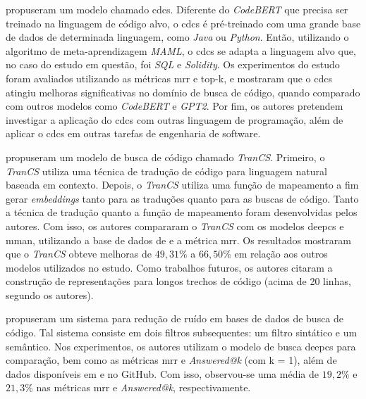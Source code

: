 \textcite{Chai2022CrossDomainDC} propuseram um modelo chamado \gls{cdcs}. Diferente do \textit{CodeBERT} que precisa ser treinado na linguagem de código alvo, o \gls{cdcs} é pré-treinado com uma grande base de dados de determinada linguagem, como \textit{Java} ou \textit{Python}. Então, utilizando o algoritmo de meta-aprendizagem \textit{MAML}, o \gls{cdcs} se adapta a linguagem alvo que, no caso do estudo em questão, foi \textit{SQL} e \textit{Solidity}. Os experimentos do estudo foram avaliados utilizando as métricas \gls{mrr} e top-k, e mostraram que o \gls{cdcs} atingiu melhoras significativas no domínio de busca de código, quando comparado com outros modelos como \textit{CodeBERT} e \textit{GPT2}. Por fim, os autores pretendem investigar a aplicação do \gls{cdcs} com outras linguagem de programação, além de aplicar o \gls{cdcs} em outras tarefas de engenharia de software.

\textcite{Sun2022CodeSB} propuseram um modelo de busca de código chamado \textit{TranCS}. Primeiro, o \textit{TranCS} utiliza uma técnica de tradução de código para linguagem natural baseada em contexto. Depois, o \textit{TranCS} utiliza uma função de mapeamento a fim gerar \textit{embeddings} tanto para as traduções quanto para as buscas de código. Tanto a técnica de tradução quanto a função de mapeamento foram desenvolvidas pelos autores.
Com isso, os autores compararam o \textit{TranCS} com os modelos \gls{deepcs} e \gls{mman}, utilizando a base de dados de \cite{Husain2019CodeSearchNetCE} e a métrica \gls{mrr}. Os resultados mostraram que o \textit{TranCS} obteve melhoras de $49,31\%$ a $66,50\%$ em relação aos outros modelos utilizados no estudo. Como trabalhos futuros, os autores citaram a construção de representações para longos trechos de código (acima de 20 linhas, segundo os autores).

\textcite{Sun2022OnTI} propuseram um sistema para redução de ruído em bases de dados de busca de código. Tal sistema consiste em dois filtros subsequentes: um filtro sintático e um semântico. Nos experimentos, os autores utilizam o modelo de busca \gls{deepcs} para comparação, bem como as métricas \gls{mrr} e \textit{Answered@k} (com k = 1), além de dados disponíveis em \cite{Husain2019CodeSearchNetCE} e no GitHub. Com isso, observou-se uma média de $19,2\%$ e $21,3\%$ nas métricas \gls{mrr} e \textit{Answered@k}, respectivamente.

